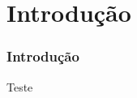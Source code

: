 \documentclass[../main/main.tex]{subfiles}
\begin{document}
    
    \section{Introdução}
    
    
    \begin{frame}
        \frametitle{Introdução}
    \end{frame}
    
   
    \begin{frame}
        Teste
    \end{frame}
    
    
    
    
    
\end{document}
